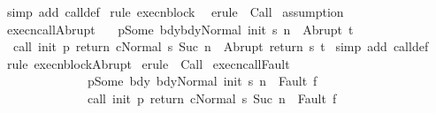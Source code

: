 \begin{isabellebody}
%
\isadelimproof
%
\endisadelimproof
%
\isatagproof
{}\isamarkupfalse%
\ {\isacharparenleft}simp\ add{\isacharcolon}\ call{\isacharunderscore}def{\isacharparenright}\isanewline
{}\isamarkupfalse%
\ {\isacharparenleft}rule\ execn{\isacharunderscore}block{\isacharparenright}\isanewline
{}\isamarkupfalse%
\ \ {\isacharparenleft}erule\ {\isacharparenleft}{}{\isacharparenright}\ Call{\isacharparenright}\isanewline
{}\isamarkupfalse%
\ assumption\isanewline
{}\isamarkupfalse%
%
\endisatagproof
{\isafoldproof}%
%
\isadelimproof
\isanewline
%
\endisadelimproof
\isanewline
\isanewline
{}\isamarkupfalse%
\ execn{\isacharunderscore}callAbrupt{\isacharcolon}\ \isanewline
\ {\isachardoublequoteopen}{\isasymlbrakk}{\isasymGamma}\ p{\isacharequal}Some\ bdy{\isacharsemicolon}{\isasymGamma}{\isasymturnstile}{\isasymlangle}bdy{\isacharcomma}Normal\ {\isacharparenleft}init\ s{\isacharparenright}{\isasymrangle}\ {\isacharequal}n{\isasymRightarrow}\ \ Abrupt\ t{\isasymrbrakk}\ \isanewline
\ \ {\isasymLongrightarrow}\ \isanewline
\ \ {\isasymGamma}{\isasymturnstile}{\isasymlangle}call\ init\ p\ return\ c{\isacharcomma}Normal\ s{\isasymrangle}\ {\isacharequal}Suc\ n{\isasymRightarrow}\ \ Abrupt\ {\isacharparenleft}return\ s\ t{\isacharparenright}{\isachardoublequoteclose}\isanewline
%
\isadelimproof
%
\endisadelimproof
%
\isatagproof
{}\isamarkupfalse%
\ {\isacharparenleft}simp\ add{\isacharcolon}\ call{\isacharunderscore}def{\isacharparenright}\isanewline
{}\isamarkupfalse%
\ {\isacharparenleft}rule\ execn{\isacharunderscore}blockAbrupt{\isacharparenright}\isanewline
{}\isamarkupfalse%
\ {\isacharparenleft}erule\ {\isacharparenleft}{}{\isacharparenright}\ Call{\isacharparenright}\isanewline
{}\isamarkupfalse%
%
\endisatagproof
{\isafoldproof}%
%
\isadelimproof
\isanewline
%
\endisadelimproof
\isanewline
{}\isamarkupfalse%
\ execn{\isacharunderscore}callFault{\isacharcolon}\ \isanewline
\ \ \ \ \ \ \ \ \ \ \ \ \ {\isachardoublequoteopen}{\isasymlbrakk}{\isasymGamma}\ p{\isacharequal}Some\ bdy{\isacharsemicolon}\ {\isasymGamma}{\isasymturnstile}{\isasymlangle}bdy{\isacharcomma}Normal\ {\isacharparenleft}init\ s{\isacharparenright}{\isasymrangle}\ {\isacharequal}n{\isasymRightarrow}\ \ Fault\ f{\isasymrbrakk}\ \isanewline
\ \ \ \ \ \ \ \ \ \ \ \ \ \ \ {\isasymLongrightarrow}\ \isanewline
\ \ \ \ \ \ \ \ \ \ \ \ \ \ {\isasymGamma}{\isasymturnstile}{\isasymlangle}call\ init\ p\ return\ c{\isacharcomma}Normal\ s{\isasymrangle}\ {\isacharequal}Suc\ n{\isasymRightarrow}\ \ Fault\ f{\isachardoublequoteclose}\isanewline

\end{isabellebody}
